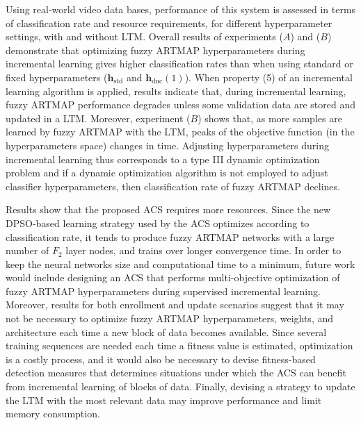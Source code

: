 Using real-world video data bases, performance of this system is assessed in terms of classification rate and resource requirements, for different hyperparameter settings, with and without LTM. Overall results of experiments ($A$) and ($B$) demonstrate that optimizing fuzzy ARTMAP hyperparameters during incremental learning gives higher classification rates than when using standard or fixed hyperparameters ($\textbf{h}_\text{std}$ and $\textbf{h}_\text{dnc}(1)$). When property (5) of an incremental learning algorithm is applied, results indicate that, during incremental learning, fuzzy ARTMAP performance degrades unless some validation data are stored and updated in a LTM. Moreover, experiment ($B$) shows that, as more samples are learned by fuzzy ARTMAP with the LTM, peaks of the objective function (in the hyperparameters space) changes in time. Adjusting hyperparameters during incremental learning thus corresponds to a type III dynamic optimization problem and if a dynamic optimization algorithm is not employed to adjust classifier hyperparameters, then classification rate of fuzzy ARTMAP declines.

Results show that the proposed ACS requires more resources. Since the new DPSO-based learning strategy used by the ACS optimizes according to classification rate, it tends to produce fuzzy ARTMAP networks with a large number of $F_2$ layer nodes, and trains over longer convergence time. In order to keep the neural networks size and computational time to a minimum, future work would include designing an ACS that performs multi-objective optimization of fuzzy ARTMAP hyperparameters during supervised incremental learning. Moreover, results for both enrollment and update scenarios suggest that it may not be necessary to optimize fuzzy ARTMAP hyperparameters, weights, and architecture each time a new block of data becomes available. Since several training sequences are needed each time a fitness value is estimated, optimization is a costly process, and it would also be necessary to devise fitness-based detection measures that determines situations under which the ACS can benefit from incremental learning of blocks of data. Finally, devising a strategy to update the LTM with the most relevant data may improve performance and limit memory consumption.